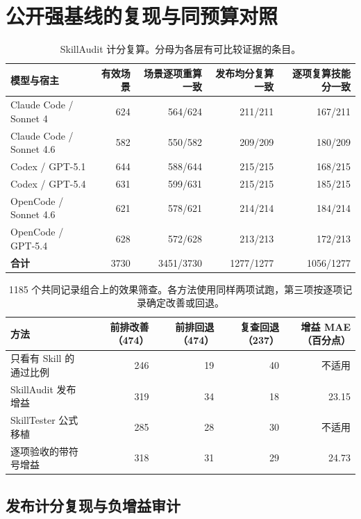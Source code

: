 \documentclass[final,5p,twocolumn,10pt]{elsarticle}
\begin{document}
\section{公开强基线的复现与同预算对照}

\begin{table}[!t]
\centering\small
\caption{SkillAudit 计分复算。分母为各层有可比较证据的条目。}
\label{tab:replay}
\begin{tabularx}{\textwidth}{@{}Yrrrr@{}}
\toprule
模型与宿主 & 有效场景 & 场景逐项重算一致 & 发布均分复算一致 & 逐项复算技能分一致 \\
\midrule
Claude Code / Sonnet 4 & 624 & 564/624 & 211/211 & 167/211 \\
Claude Code / Sonnet 4.6 & 582 & 550/582 & 209/209 & 180/209 \\
Codex / GPT-5.1 & 644 & 588/644 & 215/215 & 168/215 \\
Codex / GPT-5.4 & 631 & 599/631 & 215/215 & 185/215 \\
OpenCode / Sonnet 4.6 & 621 & 578/621 & 214/214 & 184/214 \\
OpenCode / GPT-5.4 & 628 & 572/628 & 213/213 & 172/213 \\
\textbf{合计} & 3730 & 3451/3730 & 1277/1277 & 1056/1277 \\
\bottomrule
\end{tabularx}
\end{table}

\begin{table}[!t]
\centering\small
\caption{1185 个共同记录组合上的效果筛查。各方法使用同样两项试跑，第三项按逐项记录确定改善或回退。}
\label{tab:effect-compare}
\begin{tabularx}{\textwidth}{@{}Yrrrr@{}}
\toprule
方法 & 前排改善（474） & 前排回退（474） & 复查回退（237） & 增益 MAE（百分点） \\
\midrule
只看有 Skill 的通过比例 & 246 & 19 & 40 & 不适用 \\
SkillAudit 发布增益 & 319 & 34 & 18 & 23.15 \\
SkillTester 公式移植 & 285 & 28 & 30 & 不适用 \\
逐项验收的带符号增益 & 318 & 31 & 29 & 24.73 \\
\bottomrule
\end{tabularx}
\end{table}

\subsection{发布计分复现与负增益审计}
\end{document}
